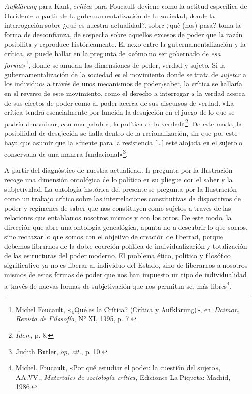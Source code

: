\emph{Aufklärung} para Kant, \emph{crítica} para Foucault deviene como la actitud específica de Occidente a partir de la gubernamentalización de la sociedad, donde la interrogación sobre ¿qué es nuestra actualidad?, sobre ¿qué (nos) pasa? toma la forma de desconfianza, de sospecha sobre aquellos excesos de poder que la razón posibilita y reproduce históricamente. El nexo entre la gubernamentalización y la crítica, se puede hallar en la pregunta de «cómo no ser gobernado de \emph{esa forma}»\footnote{Michel Foucault, «¿Qué es la Crítica? (Crítica y Aufklärung)», en~\emph{Daimon, Revista de Filosofía}, N° XI, 1995, p. 7.}, donde se anudan las dimensiones de poder, verdad y sujeto. Si la gubernamentalización de la sociedad es el movimiento donde se trata de \emph{sujetar} a los individuos a través de unos mecanismos de poder/saber, la crítica se hallaría en el reverso de este movimiento, como el derecho a interrogar a la verdad acerca de sus efectos de poder como al poder acerca de sus discursos de verdad. «La crítica tendrá esencialmente por función la desujeción en el juego de lo que se podría denominar, con una palabra, la política de la verdad»\footnote{\emph{Ídem}, p. 8.}. De este modo, la posibilidad de desujeción se halla dentro de la racionalización, sin que por esto haya que asumir que la «fuente para la resistencia {[}\ldots{]} esté alojada en el sujeto o conservada de una manera fundacional»\footnote{Judith Butler, \emph{op, cit}., p. 10.}.

A partir del diagnóstico de nuestra actualidad, la pregunta por la Ilustración recoge una dimensión ontológica de lo político en su pliegue con el saber y la subjetividad. La ontología histórica del presente se pregunta por la Ilustración como un trabajo crítico sobre las interrelaciones constitutivas de dispositivos de poder y regímenes de saber que nos constituyen como sujetos a través de las relaciones que entablamos nosotros mismos y con los otros. De este modo, la dirección que abre una ontología genealógica, apunta no a descubrir lo que somos, sino rechazar lo que somos con el objetivo de creación de libertad, porque debemos librarnos de la doble coerción política de individualización y totalización de las estructuras del poder moderno. El problema ético, político y filosófico significativo ya no es liberar al individuo del Estado, sino de liberarnos a nosotros mismos de estas formas de poder que nos han impuesto un tipo de individualidad a través de nuevas formas de subjetivación que nos permitan ser más libres\footnote{Michel. Foucault, «Por qué estudiar el poder: la cuestión del sujeto», AA.VV., \emph{Materiales de sociología crítica}, Ediciones La Piqueta: Madrid, 1986.}.

